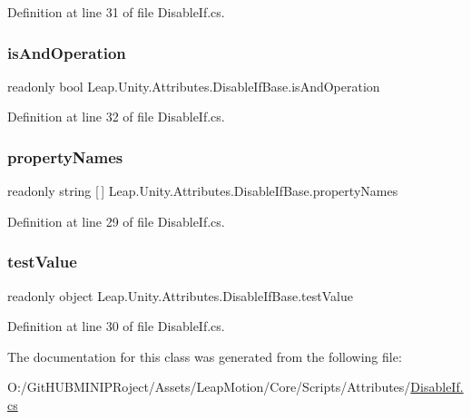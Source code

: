 Definition at line 31 of file Disable\+If.\+cs.

\mbox{\label{class_leap_1_1_unity_1_1_attributes_1_1_disable_if_base_a0b33d1b01859c98669e445ac4c0570fa}} 
\subsubsection{\texorpdfstring{isAndOperation}{isAndOperation}}
{\footnotesize\ttfamily readonly bool Leap.\+Unity.\+Attributes.\+Disable\+If\+Base.\+is\+And\+Operation}



Definition at line 32 of file Disable\+If.\+cs.

\mbox{\label{class_leap_1_1_unity_1_1_attributes_1_1_disable_if_base_a5c529573cc3c68609da4337c7acf1cf2}} 
\subsubsection{\texorpdfstring{propertyNames}{propertyNames}}
{\footnotesize\ttfamily readonly string \mbox{[}$\,$\mbox{]} Leap.\+Unity.\+Attributes.\+Disable\+If\+Base.\+property\+Names}



Definition at line 29 of file Disable\+If.\+cs.

\mbox{\label{class_leap_1_1_unity_1_1_attributes_1_1_disable_if_base_aef08e07168b8f1ca42d005a1e4dac19c}} 
\subsubsection{\texorpdfstring{testValue}{testValue}}
{\footnotesize\ttfamily readonly object Leap.\+Unity.\+Attributes.\+Disable\+If\+Base.\+test\+Value}



Definition at line 30 of file Disable\+If.\+cs.



The documentation for this class was generated from the following file\+:\begin{DoxyCompactItemize}
\item 
O\+:/\+Git\+H\+U\+B\+M\+I\+N\+I\+P\+Roject/\+Assets/\+Leap\+Motion/\+Core/\+Scripts/\+Attributes/\mbox{\hyperlink{_disable_if_8cs}{Disable\+If.\+cs}}\end{DoxyCompactItemize}
